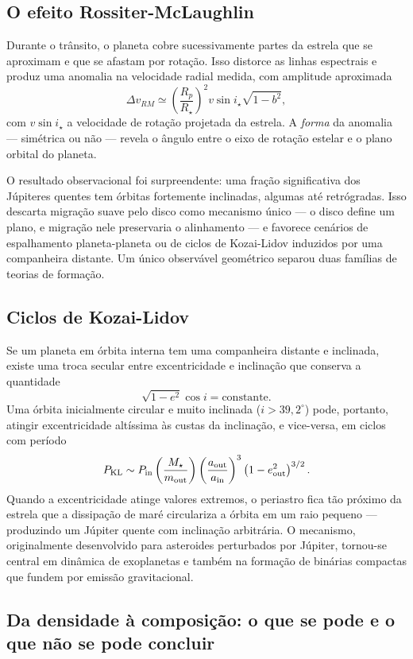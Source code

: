 \documentclass[11pt,a4paper]{article}
\begin{document}
\subsection*{O efeito Rossiter-McLaughlin}

Durante o trânsito, o planeta cobre sucessivamente partes da estrela que se aproximam e que se afastam por rotação. Isso distorce as linhas espectrais e produz uma anomalia na velocidade radial medida, com amplitude aproximada
\[
\Delta v_{RM}\simeq\left(\frac{R_p}{R_\star}\right)^{2}v\sin i_\star\sqrt{1-b^{2}},
\]
com $v\sin i_\star$ a velocidade de rotação projetada da estrela. A \emph{forma} da anomalia --- simétrica ou não --- revela o ângulo entre o eixo de rotação estelar e o plano orbital do planeta.

O resultado observacional foi surpreendente: uma fração significativa dos Júpiteres quentes tem órbitas fortemente inclinadas, algumas até retrógradas. Isso descarta migração suave pelo disco como mecanismo único --- o disco define um plano, e migração nele preservaria o alinhamento --- e favorece cenários de espalhamento planeta-planeta ou de ciclos de Kozai-Lidov induzidos por uma companheira distante. Um único observável geométrico separou duas famílias de teorias de formação.

\subsection*{Ciclos de Kozai-Lidov}

Se um planeta em órbita interna tem uma companheira distante e inclinada, existe uma troca secular entre excentricidade e inclinação que conserva a quantidade
\[
\sqrt{1-e^{2}}\cos i=\text{constante}.
\]
Uma órbita inicialmente circular e muito inclinada ($i>39{,}2^\circ$) pode, portanto, atingir excentricidade altíssima às custas da inclinação, e vice-versa, em ciclos com período
\[
P_{\rm KL}\sim P_{\rm in}\left(\frac{M_\star}{m_{\rm out}}\right)\left(\frac{a_{\rm out}}{a_{\rm in}}\right)^{3}\left(1-e_{\rm out}^{2}\right)^{3/2}.
\]
Quando a excentricidade atinge valores extremos, o periastro fica tão próximo da estrela que a dissipação de maré circulariza a órbita em um raio pequeno --- produzindo um Júpiter quente com inclinação arbitrária. O mecanismo, originalmente desenvolvido para asteroides perturbados por Júpiter, tornou-se central em dinâmica de exoplanetas e também na formação de binárias compactas que fundem por emissão gravitacional.

\subsection*{Da densidade à composição: o que se pode e o que não se pode concluir}
\end{document}
